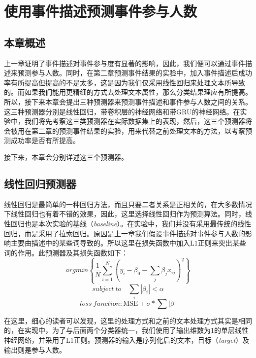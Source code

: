 \documentclass[12pt]{template}
\begin{document}
\section{使用事件描述预测事件参与人数}
\subsection{本章概述}
上一章证明了事件描述对事件参与度有显著的影响，因此，我们便可以通过事件描述来预测参与人数。同时，在第二章预测事件结果的实验中，加入事件描述后成功率有所提高但提高的不是太多，这是因为我们仅采用线性回归来处理文本所导致的。而如果我们能用更精细的方式去处理文本属性，那么分类结果理应有所提高。 所以，接下来本章会提出三种预测器来预测事件描述和事件参与人数之间的关系。这三种预测器分别是线性回归，带卷积层的神经网络和带GRU的神经网络。在实验中，我们将先考察这三类预测器在实际数据集上的表现，然后，这三个预测器将会被用在第二章的预测事件结果的实验，用来代替之前处理文本的方法，以考察预测成功率是否有所提高。

接下来，本章会分别详述这三个预测器。

\subsection{线性回归预测器}
线性回归是最简单的一种回归方法，而且只要二者关系是正相关的，在大多数情况下线性回归也有着不错的效果，因此，这里选择线性回归作为预测算法。同时，线性回归也是本次实验的基线（\textit{baseline}）。在实验中，我们并没有采用最传统的线性回归，而是采用了拉索回归。原因是上一章我们假设事件描述对事件参与人数的影响主要由描述中的某些词导致的。所以这里在损失函数中加入$\mathrm{L1}$正则来突出某些词的作用。此预测器及其损失函数如下：
\begin{equation}
argmin\left\{\frac{1}{N}\displaystyle\sum_{i=1}^{N}
(y_i-\beta_0-\displaystyle\sum_{j}\beta_jx_{ij})^2\right\}
\end{equation}
\begin{equation}
subject\ to \quad \displaystyle\sum_{i}|\beta_i|<\alpha
\end{equation}
\begin{equation}
loss\ function: \mathrm{MSE}+\sigma*\sum|\beta|
\end{equation}

在这里，细心的读者可以发现，这里的处理方式和之前的文本处理方式其实是相同的，在实现中，为了与后面两个分类器统一，我们使用了输出维数为1的单层线性神经网络，并采用了L1正则。预测器的输入是序列化后的文本，目标（\textit{target}）及输出则是参与人数。
\end{document}
